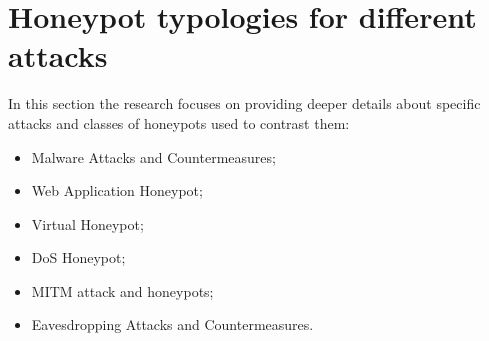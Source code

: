 \chapter{Honeypot typologies for different attacks}
In this section the research focuses on providing deeper details about specific attacks and classes of honeypots used to contrast them:
\begin{itemize}
    \item Malware Attacks and Countermeasures;
    \item Web Application Honeypot;
    \item Virtual Honeypot;
    \item DoS Honeypot;
    \item MITM attack and honeypots;
    \item Eavesdropping Attacks and Countermeasures.
\end{itemize}







